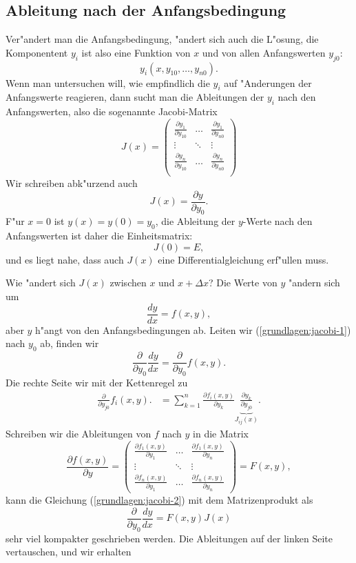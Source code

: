 \subsection{Ableitung nach der Anfangsbedingung}
Ver"andert man die Anfangsbedingung, "andert sich auch die L"osung,
die Komponentent $y_i$ ist also eine Funktion von $x$ und
von allen Anfangswerten $y_{j0}$:
\[
y_i(x, y_{10},\dots,y_{n0}).
\]
Wenn man untersuchen will, wie empfindlich die $y_i$ auf "Anderungen
der Anfangswerte reagieren, dann sucht man die Ableitungen der $y_i$
nach den Anfangswerten, also die sogenannte Jacobi-Matrix
\[
J(x)
=
\begin{pmatrix}
\displaystyle\frac{\partial y_1}{\partial y_{10}}&\dots&
	\displaystyle\frac{\partial y_1}{\partial y_{n0}}\\
\vdots&\ddots&\vdots\\
\displaystyle\frac{\partial y_n}{\partial y_{10}}&\dots&
	\displaystyle\frac{\partial y_n}{\partial y_{n0}}\\
\end{pmatrix}
\]
Wir schreiben abk"urzend auch 
\[
J(x)= \frac{\partial y}{\partial y_0}.
\]
F"ur $x=0$ ist $y(x)=y(0)=y_0$, die Ableitung der $y$-Werte nach den
Anfangswerten ist daher die Einheitsmatrix:
\[
J(0)=E,
\]
und es liegt nahe, dass auch $J(x)$ eine Differentialgleichung erf"ullen
muss.

Wie "andert sich $J(x)$ zwischen $x$ und $x+\Delta x$?
Die Werte von $y$ "andern sich um
\begin{equation}
\frac{dy}{dx}= f(x,y),
\label{grundlagen:jacobi-1}
\end{equation}
aber $y$ h"angt von den Anfangsbedingungen ab.
Leiten wir (\ref{grundlagen:jacobi-1}) nach $y_0$ ab, finden wir
\begin{equation}
\frac{\partial}{\partial y_0}\frac{dy}{dx}
=
\frac{\partial}{\partial y_0}f(x,y).
\label{grundlagen:jacobi-2}
\end{equation}
Die rechte Seite wir mit der Kettenregel zu
\begin{align*}
\frac{\partial}{\partial y_{j0}}f_i(x,y).
&=
\sum_{k=1}^n \frac{\partial f_i(x,y)}{\partial y_{k}}
\underbrace{\frac{\partial y_k}{\partial y_{j0}}}_{J_{ij}(x)}.
\end{align*}
Schreiben wir die Ableitungen von $f$ nach $y$ in die Matrix
\[
\frac{\partial f(x,y)}{\partial y}
=
\begin{pmatrix}
\displaystyle\frac{\partial f_1(x,y)}{\partial y_1}&\dots&
	\displaystyle\frac{\partial f_1(x,y)}{\partial y_n}\\
\vdots&\ddots&\vdots\\
\displaystyle\frac{\partial f_n(x,y)}{\partial y_1}&\dots&
	\displaystyle\frac{\partial f_n(x,y)}{\partial y_n}
\end{pmatrix}
=F(x,y),
\]
kann die Gleichung (\ref{grundlagen:jacobi-2}) mit dem Matrizenprodukt als
\begin{equation*}
\frac{\partial}{\partial y_0}\frac{dy}{dx}
=
F(x,y)J(x)
\end{equation*}
sehr viel kompakter geschrieben werden.
Die Ableitungen auf der linken Seite vertauschen, und wir erhalten

